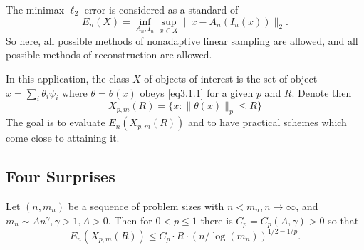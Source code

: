 The minimax $\ell_2$ error is considered as a standard of 
\begin{equation*}
    E_n(X) = \inf\limits_{A_n,I_n} \sup\limits_{x \in X} \|x-A_n(I_n(x))\|_2.
\end{equation*}
So here, all possible methods of nonadaptive linear sampling are allowed, and all possible methods of reconstruction are allowed. 

In this application, the class $X$ of objects of interest is the set of object $x = \sum_i\theta_i\psi_i$ where $\theta = \theta(x)$ obeys \cref{eq3.1.1} for a given $p$ and $R$. Denote then
\begin{equation*}
    X_{p,m}(R) = \{x:\|\theta(x)\|_p \leq R\} 
\end{equation*}
The goal is to evaluate $E_n(X_{p,m}(R))$ and to have practical schemes which come close to attaining it.
\subsection{Four Surprises}
\begin{theorem}
    Let $(n, m_n)$ be a sequence of problem sizes with $n<m_n, n \rightarrow \infty$, and $m_n \sim An^{\gamma}, \gamma > 1, A>0$. Then for $0<p\leq 1$ there is $C_p = C_p(A,\gamma)>0$ so that
    \begin{equation}
        E_n(X_{p,m}(R)) \leq C_p \cdot R \cdot (n/\log (m_n))^{1/2-1/p}
        \label{eq3.1.3}.
    \end{equation}
    \label{th3.1.1}
\end{theorem}

